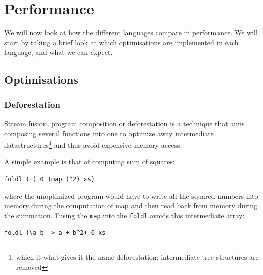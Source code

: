 
\chapter{Performance}
We will now look at how the different languages compare in
performance. We will start by taking a brief look at which
optimisations are implemented in each language, and what we can expect.

\section{Optimisations}

\subsection{Deforestation}
Stream fusion, program composition or deforestation is a technique
that aims composing several functions into one to optimize away
intermediate datastructures\footnote{which it what gives it the name
  deforestation: intermediate tree structures are removed} and thus
avoid expensive memory access.

A simple example is that of computing sum of squares:
\begin{verbatim}
foldl (+) 0 (map (^2) xs)
\end{verbatim}
where the unoptimized program would have to write all the squared
numbers into memory during the computation of map and then read back
from memory during the summation. Fusing the \verb|map| into the
\verb|foldl| avoids this intermediate array:
\begin{verbatim}
foldl (\a b -> a + b^2) 0 xs
\end{verbatim}

